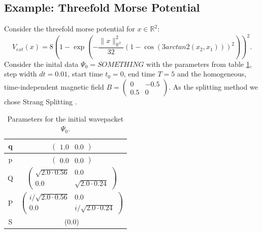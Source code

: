\documentclass{article}
\begin{document}
\subsection{Example: Threefold Morse Potential}
Consider the threefold morse potential for $x \in \mathbb{R}^2$:
\begin{equation}
  V_{ext}(x) = 8 \left(1 - \exp\left( - \frac{\lVert x \rVert _{\mathbb{R}^2}^2}{32}(1 - \cos(3arctan2(x_2, x_1)))^2\right)\right)^2.
\end{equation}
Consider the inital data $\Psi_0 = SOMETHING$ with the parameters from table \ref{tab:params}, step width $dt=0.01$, start time $t_0=0$, end time $T=5$ and the homogeneous, time-independent magnetic field $B = \begin{pmatrix} 0 & -0.5 \\ 0.5 & 0 \end{pmatrix}$. As the splitting method we chose Strang Splitting \cite{strang_splitting}.
\begin{table}
  \centering
  \begin{tabular}{c|c}
    q & $\begin{pmatrix}1.0 & 0.0 \end{pmatrix}$ \\ \hline
    p & $\begin{pmatrix}0.0 & 0.0 \end{pmatrix}$ \\ \hline
    Q & $\begin{pmatrix}
      \sqrt{2.0 \cdot 0.56} & 0.0 \\
      0.0 & \sqrt{2.0 \cdot 0.24}
    \end{pmatrix}$ \\ \hline
    P & $\begin{pmatrix}
      i/\sqrt{2.0 \cdot 0.56} & 0.0 \\
      0.0 & i/\sqrt{2.0 \cdot 0.24}
    \end{pmatrix}$ \\ \hline
    S & (0.0) \\
  \end{tabular}
  \caption{Parameters for the initial wavepacket $\Psi_0$.}
  \label{tab:params}

\end{table}
\end{document}
